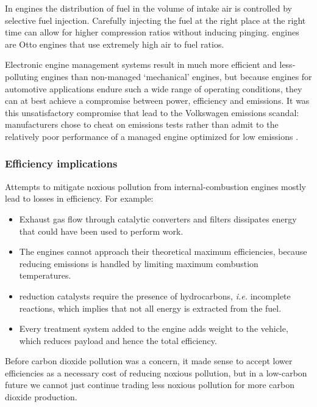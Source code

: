 In  engines the distribution of fuel in the volume of
intake air is controlled by selective fuel injection. Carefully injecting the
fuel at the right place at the right time can allow for higher compression
ratios without inducing pinging.  engines are Otto engines
that use extremely high air to fuel ratios.

Electronic engine management systems result in much more efficient and
less-polluting engines than non-managed `mechanical' engines, but because
engines for automotive applications endure such a wide range of operating
conditions, they can at best achieve a compromise between power, efficiency and
emissions. It was this unsatisfactory compromise that lead to the Volkswagen
emissions scandal: manufacturers chose to cheat on emissions tests rather than
admit to the relatively poor performance of a managed engine optimized for low
emissions \autocite{Mansouri2016}.

\subsubsection{Efficiency implications}

Attempts to mitigate noxious pollution from internal\hyp{}combustion engines
mostly lead to losses in efficiency. For example:

\begin{itemize}

\item Exhaust gas flow through catalytic converters and filters dissipates
energy that could have been used to perform work.
  
\item The engines cannot approach their theoretical maximum efficiencies,
because reducing \nox emissions is handled by limiting maximum combustion
temperatures.

\item \nox reduction catalysts require the presence of hydrocarbons,
\textit{i.e.} incomplete reactions, which implies that not all energy is
extracted from the fuel.

\item Every treatment system added to the engine adds weight to the vehicle, which
reduces payload and hence the total efficiency.

\end{itemize}

Before carbon dioxide pollution was a concern, it made sense to accept lower
efficiencies as a necessary cost of reducing noxious pollution, but in a
low-carbon future we cannot just continue trading less noxious pollution for
more carbon dioxide production.

